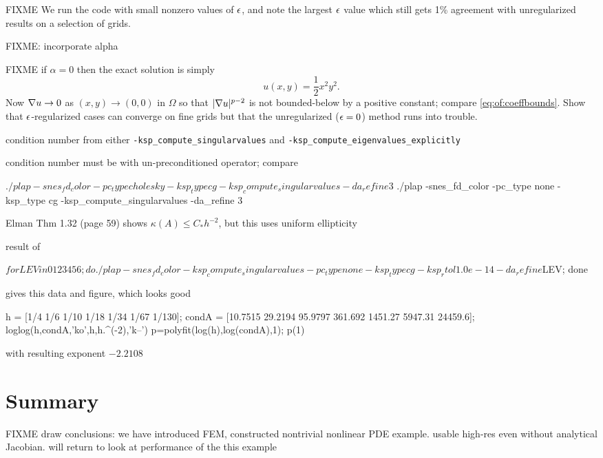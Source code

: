 FIXME We run the code with small nonzero values of $\epsilon$, and note the largest $\epsilon$ value which still gets 1\% agreement with unregularized results on a selection of grids.

FIXME: incorporate alpha

FIXME if $\alpha=0$ then the exact solution is simply
\begin{equation}
    u(x,y) = \frac{1}{2} x^2 y^2. \label{eq:of:exactsolutionbad}
\end{equation}
Now $\nabla u \to 0$ as $(x,y)\to(0,0)$ in $\Omega$ so that $|\nabla u|^{p-2}$ is not bounded-below by a positive constant; compare \eqref{eq:of:coeffbounds}.  Show that $\epsilon$-regularized cases can converge on fine grids but that the unregularized ($\epsilon=0$) method runs into trouble.

condition number from either \texttt{-ksp\_compute\_singularvalues} and \texttt{-ksp\_compute\_eigenvalues\_explicitly}

condition number must be with un-preconditioned operator; compare
\begin{cline}
$ ./plap -snes_fd_color -pc_type cholesky -ksp_type cg -ksp_compute_singularvalues -da_refine 3
$ ./plap -snes_fd_color -pc_type none -ksp_type cg -ksp_compute_singularvalues -da_refine 3
\end{cline}

Elman Thm 1.32 (page 59) shows $\kappa(A) \le C_* h^{-2}$, but this uses uniform ellipticity

result of
\begin{cline}
$ for LEV in 0 1 2 3 4 5 6; do ./plap -snes_fd_color -ksp_compute_singularvalues -pc_type none -ksp_type cg -ksp_rtol 1.0e-14 -da_refine $LEV; done
\end{cline}
gives this data and figure, which looks good
\begin{code}
h = [1/4 1/6 1/10 1/18 1/34 1/67 1/130];
condA = [10.7515 29.2194 95.9797 361.692 1451.27 5947.31 24459.6];
loglog(h,condA,'ko',h,h.^(-2),'k--')
p=polyfit(log(h),log(condA),1);
p(1)
\end{code}
with resulting exponent $-2.2108$


\section{Summary}

FIXME draw conclusions: we have introduced FEM, constructed nontrivial nonlinear PDE example.  usable high-res even without analytical Jacobian.  will return to look at performance of the this example



